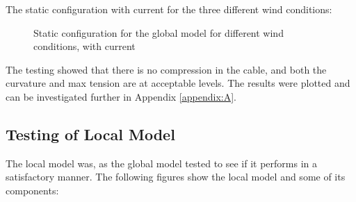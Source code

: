 The static configuration with current for the three different wind conditions: 
\begin{figure}[H]
\hfill
{}\hfill
  \hfill
\caption{Static configuration for the global model for different wind conditions, with current}
\label{fig:statcon}
\end{figure}

The testing showed that there is no compression in the cable, and both the curvature and max tension are at acceptable levels. The results were plotted and can be investigated further in Appendix \ref{appendix:A}. 


\subsection{Testing of Local Model}
The local model was, as the global model tested to see if it performs in a satisfactory manner. The following figures show the local model and some of its components:

